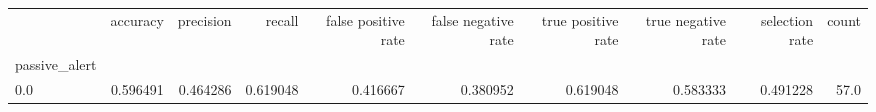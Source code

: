 \begin{tabular}{lrrrrrrrrr}
\toprule
{} &  accuracy &  precision &    recall &  false positive rate &  false negative rate &  true positive rate &  true negative rate &  selection rate &  count \\
passive\_alert &           &            &           &                      &                      &                     &                     &                 &        \\
\midrule
0.0           &  0.596491 &   0.464286 &  0.619048 &             0.416667 &             0.380952 &            0.619048 &            0.583333 &        0.491228 &   57.0 \\
\bottomrule
\end{tabular}
